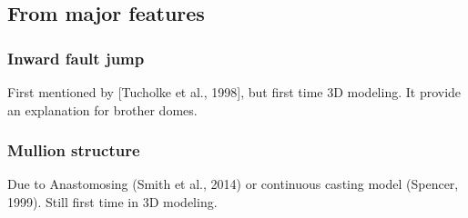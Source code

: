 \documentclass[11pt]{article}
\begin{document}
\subsection{From major features}
\label{sec-2-2}
\subsubsection{Inward fault jump}
\label{sec-2-2-1}
First mentioned by [Tucholke et al., 1998], but first time 3D modeling. It provide an explanation for brother domes.
\subsubsection{Mullion structure}
\label{sec-2-2-2}
Due to Anastomosing (Smith et al., 2014) or continuous casting model (Spencer, 1999). Still first time in 3D modeling.
\end{document}

